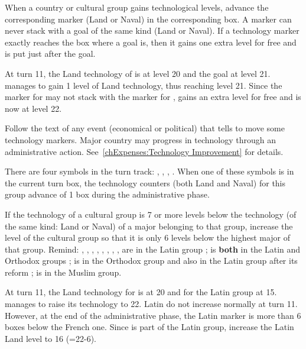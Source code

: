 \aparag[Progression] When a country or cultural group gains technological
levels, advance the corresponding marker (Land or Naval) in the corresponding
box.
\bparag A marker can never stack with a goal of the same kind (Land or
Naval). If a technology marker exactly reaches the box where a goal is, then
it gains one extra level for free and is put just after the goal.

\begin{exemple}
  At turn 11, the Land technology of \FRA is at level 20 and the goal \TARQ at
  level 21. \FRA manages to gain 1 level of Land technology, thus reaching
  level 21. Since the marker for \FRA may not stack with the marker for \TARQ,
  \FRA gains an extra level for free and is now at level 22.
\end{exemple}

 Follow the text of any event (economical or
political) that tells to move some technology markers.
\bparag Major country may progress in technology through an administrative
action. See~\ref{chExpenses:Technology Improvement} for details.

 There are four symbols in the turn track:
\techlatin, \techislam, \techortho, \techrotw. When one of these symbols is in
the current turn box, the technology counters (both Land and Naval) for this
group advance of 1 box during the administrative phase.

\label{chExpenses:Technology:Cultural Adjustment}
If the technology of a cultural group is 7 or more levels below the technology
(of the same kind: Land or Naval) of a major belonging to that group, increase
the level of the cultural group so that it is only 6 levels below the highest
major of that group.
\bparag Remind: \POR, \SPA, \FRA, \ANG, \VEN, \HOL, \SUE, \AUS, \PRU are in
the Latin group ; \POL is \textbf{both} in the Latin and Orthodox groups ;
\RUS is in the Orthodox group and also in the Latin group after its reform ;
\TUR is in the Muslim group.

\begin{exemple}
  At turn 11, the Land technology for \FRA is at 20 and for the Latin group at
  15. \FRA manages to raise its technology to 22. Latin do not increase
  normally at turn 11. However, at the end of the administrative phase, the
  Latin marker is more than 6 boxes below the French one. Since \FRA is part
  of the Latin group, increase the Latin Land level to 16 (=22-6).
\end{exemple}

